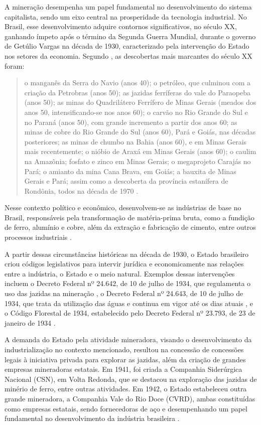 A mineração desempenha um papel fundamental no desenvolvimento do sistema capitalista, sendo um eixo central na prosperidade da tecnologia industrial. No Brasil, esse desenvolvimento adquire contornos significativos, no século XX, ganhando ímpeto após o término da Segunda Guerra Mundial, durante o governo de Getúlio Vargas na década de 1930, caracterizado pela intervenção do Estado nos setores da economia. Segundo \citeauthor{barreto2001mineracao}, as descobertas mais marcantes do século XX foram:

\begin{quotation}
o manganês da Serra do Navio (anos 40); o petróleo, que culminou com a criação da Petrobras (anos 50); as jazidas ferríferas do vale do Paraopeba (anos 50); as minas do Quadrilátero Ferrífero de Minas Gerais (meados dos anos 50, intensificando-se nos anos 60); o carvão no Rio Grande do Sul e no Paraná (anos 50), com grande incremento a partir dos anos 60; as minas de cobre do Rio Grande do Sul (anos 60), Pará e Goiás, nas décadas posteriores; as minas de chumbo na Bahia (anos 60), e em Minas Gerais mais recentemente; o nióbio de Araxá em Minas Gerais (anos 60); o caulim na Amazônia; fosfato e zinco em Minas Gerais; o megaprojeto Carajás no Pará; o amianto da mina Cana Brava, em Goiás; a bauxita de Minas Gerais e Pará; assim como a descoberta da província estanífera de Rondônia, todos na década de 1970 \cite[p. 6]{barreto2001mineracao}.
\end{quotation}

Nesse contexto político e econômico, desenvolvem-se as indústrias de base no Brasil, responsáveis pela transformação de matéria-prima bruta, como a fundição de ferro, alumínio e cobre, além da extração e fabricação de cimento, entre outros processos industriais \cite[p. 7]{domingues2022historia}.

A partir dessas circunstâncias históricas na década de 1930, o Estado brasileiro criou códigos legislativos para intervir jurídica e economicamente nas relações entre a indústria, o Estado e o meio natural. Exemplos dessas intervenções incluem o Decreto Federal nº 24.642, de 10 de julho de 1934, que regulamenta o uso das jazidas na mineração \cite{codigominas1934}, o Decreto Federal nº 24.643, de 10 de julho de 1934, que trata da utilização das águas e continua em vigor até os dias atuais \cite{codigoaguas1934}, e o Código Florestal de 1934, estabelecido pelo Decreto Federal nº 23.793, de 23 de janeiro de 1934 \cite{codigoflorestal1934}.

A demanda do Estado pela atividade mineradora, visando o desenvolvimento da industrialização no contexto mencionado, resultou na concessão de concessões legais à iniciativa privada para explorar as jazidas, além da criação de grandes empresas mineradoras estatais. Em 1941, foi criada a Companhia Siderúrgica Nacional (CSN), em Volta Redonda, que se destacou na exploração das jazidas de minério de ferro, entre outras atividades. Em 1942, o Estado estabeleceu outra grande mineradora, a Companhia Vale do Rio Doce (CVRD), ambas constituídas como empresas estatais, sendo fornecedoras de aço e desempenhando um papel fundamental no desenvolvimento da indústria brasileira \cite[p. 8]{domingues2022historia}.

